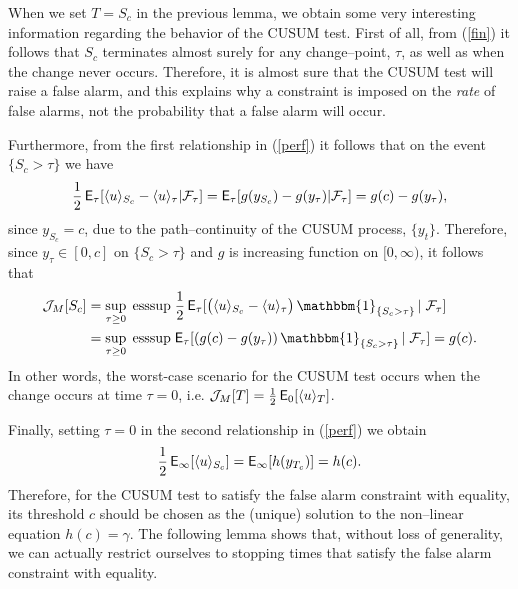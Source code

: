 \documentclass[11pt,reqno]{amsart}
\theoremstyle{remark}
\begin{document}
When we set ${T}={S_{c}}$ in the previous lemma, we obtain some very interesting information regarding the behavior of the CUSUM test. First of all, from (\ref{fin}) it follows that ${S_{c}}$ terminates almost surely for any change--point, $\tau$, as well as when the change never occurs.  Therefore, it is almost sure that the CUSUM test will raise a false alarm, and this explains why a constraint is imposed on the \textit{rate} of false alarms, not the probability that a false alarm will occur.  

Furthermore, from the first relationship in (\ref{perf}) it follows that  on the event $\{{S_{c}} >\tau\}$ we have
\begin{equation*} 
\frac{1}{2} \, {{\sf E}}_{\tau}[ \langle u \rangle_{S_{c}} - \langle u \rangle_{\tau} |{\mathcal{F}}_{\tau}] = {{\sf E}}_{\tau}[g(y_{S_{c}})-g(y_{\tau})| {\mathcal{F}}_{\tau}]= g(c)-g(y_{\tau}),
\end{equation*}
since $y_{S_{c}}=c$, due to the path--continuity of the CUSUM process, $\{y_{t}\}$. Therefore, since $y_{\tau}\in [0,c]$ on $\{{S_{c}} >\tau\}$ and $g$ is  increasing function on $[0,\infty)$, it follows that
\begin{align} \label{percus}
\begin{split}
{\mathcal{J}}_{M}[{S_{c}}] &= \sup_{ \tau \geq 0} \; \text{esssup}  \; \frac{1}{2} \, {{\sf E}}_{\tau} [\bigl(\langle u \rangle_{S_{c}}-\langle u \rangle_{\tau} \bigr) \, {\mathbbm{1}_{\{{{S_{c}} >\tau}\}}} \, | \; {\mathcal{F}}_{\tau}] \\
              &= \sup_{ \tau \geq 0} \; \text{esssup}  \; {{\sf E}}_{\tau} [ (g(c)-g(y_{\tau})) \, {\mathbbm{1}_{\{{{S_{c}} >\tau}\}}} \,| \; {\mathcal{F}}_{\tau}]=g(c).
\end{split}              
\end{align}
In other words, the worst-case scenario for the CUSUM test occurs when the change occurs at time $\tau=0$, i.e. ${\mathcal{J}}_{M}[T]= \frac{1}{2} \, {{\sf E}}_{0}[\langle u \rangle_{T}]$.

Finally, setting $\tau=0$ in the second relationship in (\ref{perf}) we obtain  
$$ \frac{1}{2} \, {{\sf E}}_{\infty}[\langle u \rangle_{S_{c}}]= {{\sf E}}_{\infty}[h(y_{T_{c}})]=h(c).$$
Therefore, for the CUSUM test to satisfy the false alarm constraint with equality, its threshold $c$ should be chosen 
as the (unique) solution to the non--linear equation $h(c)=\gamma$. The following lemma shows that, without loss of generality, we can actually 
restrict ourselves to stopping times that satisfy the  false alarm constraint with equality. 
\end{document}
